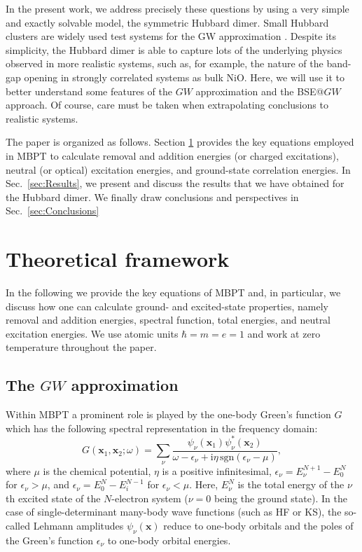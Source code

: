 \documentclass[aps,prb,reprint,superscriptaddress]{revtex4-1}
\newcommand{\bx}{\boldsymbol{x}}
\newcommand{\Nel}{N}
\newcommand{\eps}{\epsilon}
\newcommand{\I}{\text{i}}
\begin{document}
In the present work, we address precisely these questions by using a very simple and exactly solvable model, the symmetric Hubbard dimer. Small Hubbard clusters are widely used test systems for the GW approximation \citep[e.g.][]{Verdozzi_1995,Schindlmayr_1998b,Pollehn_1998,vonFriesen_2010,Romaniello_2009a,Romaniello_2012}.  Despite its simplicity, the Hubbard dimer is able to capture lots of the underlying physics observed in more realistic systems, \citep{Romaniello_2009a,Romaniello_2012,Carrascal_2015,Carrascal_2018} such as, for example, the nature of the band-gap opening in strongly correlated systems as bulk NiO. \citep{DiSabatino_2016}
Here, we will use it to better understand some features of the $GW$ approximation and the BSE@$GW$ approach.  
Of course, care must be taken when extrapolating conclusions to realistic systems. 

The paper is organized as follows. Section \ref{sec:Theory} provides the key equations employed in MBPT to calculate removal and addition energies (or charged excitations), neutral (or optical) excitation energies, and ground-state correlation energies. 
In Sec.~\ref{sec:Results}, we present and discuss the results that we have obtained for the Hubbard dimer. We finally draw conclusions and perspectives in Sec.~\ref{sec:Conclusions}

\section{Theoretical framework}
\label{sec:Theory}
In the following we provide the key equations of MBPT \citep{Martin_2016} and, in particular, we discuss how one can calculate ground- and excited-state properties, namely removal and addition energies, spectral function, total energies, and neutral excitation energies. We use atomic units $\hbar=m=e=1$ and work at zero temperature throughout the paper.

\subsection{The $GW$ approximation}
\label{sec:GWA}
Within MBPT a prominent role is played by the one-body Green's function $G$ which has the following spectral representation in the frequency domain:
\begin{equation}
\label{Eqn:spectralG}
	G(\bx_1,\bx_2; \omega ) = \sum_\nu \frac{ \psi_\nu(\bx_1) \psi^*_\nu(\bx_2) }{ \omega - \eps_\nu + \I \eta \, \text{sgn}(\eps_\nu - \mu ) },
\end{equation}
where $\mu$ is the chemical potential, $\eta$ is a positive infinitesimal, $\eps_\nu = E_\nu^{\Nel+1} - E_0^{\Nel}$ for $\eps_\nu > \mu$, and $\eps_\nu = E_0^{\Nel} - E_i^{\Nel-1}$ for $\eps_\nu < \mu$.
Here, $E_\nu^{\Nel}$ is the total energy of the $\nu$th excited state of the $\Nel$-electron system ($\nu = 0$ being the ground state).
In the case of single-determinant many-body wave functions (such as HF or KS), the so-called Lehmann amplitudes $\psi_\nu(\bx)$ reduce to one-body orbitals and the poles of the Green's function $\eps_\nu$ to one-body orbital energies.
\end{document}
